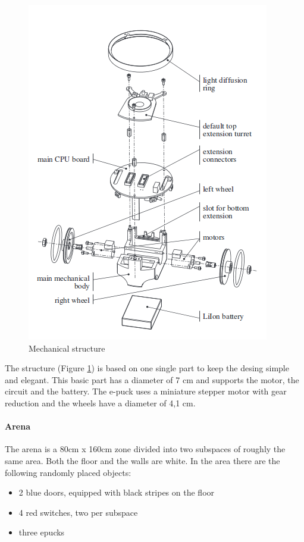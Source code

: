 \documentclass[12pt,a4paper]{article}
\begin{document}
\begin{figure}[h!]
\begin{center}
\includegraphics[scale=0.5]{images/epuck-concept.png}
\caption{Mechanical structure}
\label{fig:epuck structure}
\end{center}
\end{figure} 

\noindent The structure (Figure \ref{fig:epuck structure}) is based on one single part to keep the desing simple and elegant. This basic part has a diameter of 7 cm and supports the motor, the circuit and the battery. The e-puck uses a miniature stepper motor with gear reduction and the wheels have a diameter of 4,1 cm. 

\paragraph{Arena}
The arena is a 80cm x 160cm zone divided into two subspaces of roughly the same area. Both the floor and the walls are white. In the area there are the following randomly placed objects:
\begin{itemize}
	\item 2 blue doors, equipped with black stripes on the floor
	\item 4 red switches, two per subspace
	\item three epucks
\end{itemize}
\end{document}
